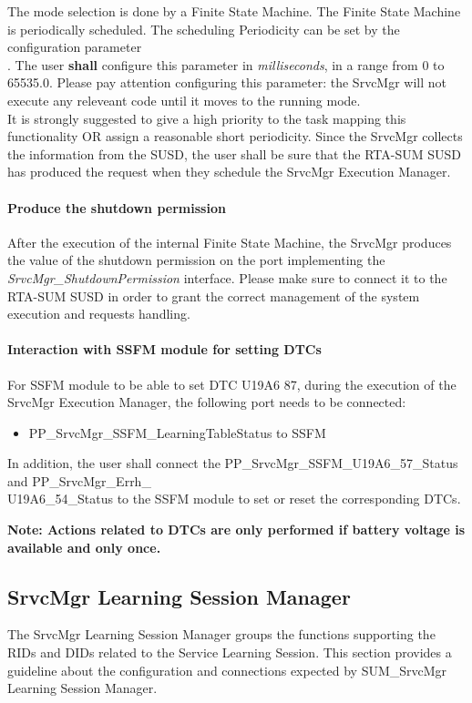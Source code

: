 The mode selection is done by a Finite State Machine. The Finite State Machine is periodically scheduled. The scheduling Periodicity can be 
set by the configuration parameter \\. The user \textbf{shall} configure this parameter in \textit{milliseconds}, in a range from 0 to 65535.0.
Please pay attention configuring this parameter: the SrvcMgr will not execute any releveant code until it moves to the running mode. 
\\It is strongly suggested to give a high priority to the task mapping this functionality OR assign a reasonable short periodicity. Since the SrvcMgr collects the information from the SUSD, the user shall be sure that 
the RTA-SUM SUSD has produced the request when they schedule the SrvcMgr Execution Manager.

\paragraph{Produce the shutdown permission}
After the execution of the internal Finite State Machine, the SrvcMgr produces the value of the shutdown permission on the port implementing the 
\textit{SrvcMgr\_ShutdownPermission} interface. Please make sure to connect it to the RTA-SUM SUSD in order to grant the correct management of the system execution and requests handling.

\paragraph{Interaction with SSFM module for setting DTCs}
For SSFM module to be able to set DTC U19A6 87, during the execution of the SrvcMgr Execution Manager, the following port needs to be connected:
 \begin{itemize}
    \item PP\_SrvcMgr\_SSFM\_LearningTableStatus to SSFM
  \end{itemize}
In addition, the user shall connect the PP\_SrvcMgr\_SSFM\_U19A6\_57\_Status and PP\_SrvcMgr\_Errh\_\\U19A6\_54\_Status to the SSFM module to set or reset the corresponding DTCs.

\textbf{Note: Actions related to DTCs are only performed if battery voltage is available and only once.} 

\subsection{SrvcMgr Learning Session Manager}
The SrvcMgr Learning Session Manager groups the functions supporting the RIDs and DIDs related to the Service Learning Session. This section provides a guideline about the configuration and 
connections expected by SUM\_SrvcMgr Learning Session Manager.

